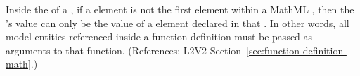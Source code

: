 Inside the  of a \FunctionDefinition, if a
 element is not the first element within a MathML
, then the 's value can only be the value
of a  element declared in that .  In
other words, all model entities referenced inside a function
definition must be passed as arguments to that function.
(References: L2V2 Section~\ref{sec:function-definition-math}.)
